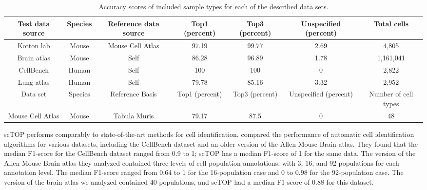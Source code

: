\documentclass[vruler,JEB]{COB}%
\begin{document}
\begin{table*}[h!]
\centering
\begin{tabular}{| c | c | c | c | c | c | c |}
\hline
Test data source & Species & Reference data source & Top1 (percent) & Top3 (percent) & Unspecified (percent) & Total cells \\ 
\hline
Kotton lab & Mouse & Mouse Cell Atlas & 97.19 & 99.77 & 2.69 & 4,805 \\ 
\hline
Brain atlas & Mouse & Self & 86.28 & 96.89 & 1.78 & 1,161,041 \\
\hline
CellBench & Human & Self & 100 & 100 & 0 & 2,822 \\
\hline
Lung atlas & Human & Self & 79.78 & 85.16 & 3.32 & 2,952 \\  
\hline
\hline
Data set & Species & Reference Basis & Top1 (percent) & Top3 (percent) & Unspecified (percent) & Number of cell types \\
\hline
Mouse Cell Atlas & Mouse & Tabula Muris & 79.17 & 87.5 & 0 & 48 \\
\hline

\end{tabular}
\caption{Accuracy scores of included sample types for each of the described data sets.}
\label{table:1}
\end{table*}

scTOP performs comparably to state-of-the-art methods for cell identification. \cite{abdelaal_comparison_2019} compared the performance of automatic cell identification algorithms for various datasets, including the CellBench dataset and an older version of the Allen Mouse Brain atlas. They found that the median F1-score for the CellBench dataset ranged from 0.9 to 1; scTOP has a median F1-score of 1 for the same data. The version of the Allen Mouse Brain atlas they analyzed contained three levels of cell population annotations, with 3, 16, and 92 populations for each annotation level. The median F1-score ranged from 0.64 to 1 for the 16-population case and 0 to 0.98 for the 92-population case. The version of the brain atlas we analyzed contained 40 populations, and scTOP had a median F1-score of 0.88 for this dataset. 
\end{document}
